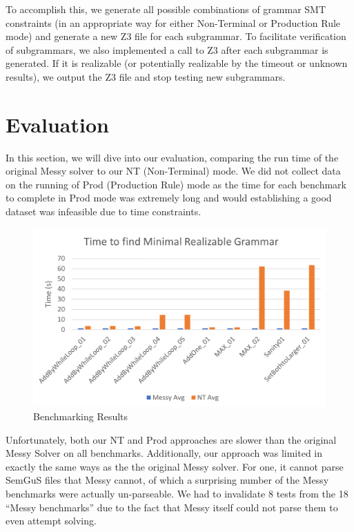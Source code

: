 \documentclass[acmsmall, nonacm]{acmart}
\begin{document}
To accomplish this, we generate all possible combinations of grammar SMT constraints (in an appropriate way for either Non-Terminal or Production Rule mode) and generate a new Z3 file for each subgrammar. To facilitate verification of subgrammars, we also implemented a call to Z3 after each subgrammar is generated. If it is realizable (or potentially realizable by the timeout or unknown results), we output the Z3 file and stop testing new subgrammars.

\section{Evaluation}

In this section, we will dive into our evaluation, comparing the run time of the original Messy solver to our NT (Non-Terminal) mode. We did not collect data on the running of Prod (Production Rule) mode as the time for each benchmark to complete in Prod mode was extremely long and would establishing a good dataset was infeasible due to time constraints.

\begin{figure}[H]
  \centering
  \includegraphics[width=1\textwidth]{Results.png}
  \caption{Benchmarking Results}
  \label{fig:Benchmarking-Results}
\end{figure}

Unfortunately, both our NT and Prod approaches are slower than the original Messy Solver on all benchmarks.
Additionally, our approach was limited in exactly the same ways as the the original Messy solver. For one, it cannot parse SemGuS files that Messy cannot, of which a surprising number of the Messy benchmarks were actually un-parseable.
We had to invalidate 8 tests from the 18 “Messy benchmarks” due to the fact that Messy itself could not parse them to even attempt solving.
\end{document}

